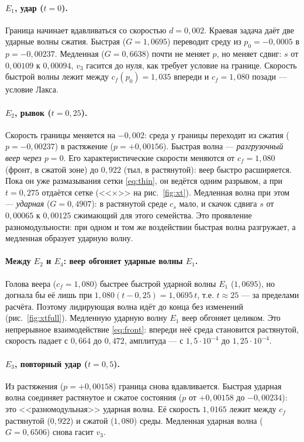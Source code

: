 \documentclass[11pt,a4paper]{article}
\theoremstyle{definition}
\theoremstyle{remark}
\begin{document}
\paragraph{$E_1$, удар ($t=0$).} Граница начинает вдавливаться со скоростью $d=0{,}002$. Краевая
задача даёт две ударные волны сжатия. Быстрая ($G=1{,}0695$) переводит среду из $p_0=-0{,}0005$
в $p=-0{,}00237$. Медленная ($G=0{,}6638$) почти не меняет $p$, но меняет сдвиг: $s$ от
$0{,}00109$ к $0{,}00094$, $v_3$ гасится до нуля, как требует условие на границе. Скорость
быстрой волны лежит между $c_f(p_0)=1{,}035$ впереди и $c_f=1{,}080$ позади --- условие Лакса.

\paragraph{$E_2$, рывок ($t=0{,}25$).} Скорость границы меняется на $-0{,}002$: среда у границы
переходит из сжатия ($p=-0{,}00237$) в растяжение ($p=+0{,}00156$). Быстрая волна ---
\emph{разгрузочный веер через $p=0$}. Его характеристические скорости меняются от $c_f=1{,}080$
(фронт, в сжатой зоне) до $0{,}922$ (тыл, в растянутой): веер быстро расширяется. Пока он уже
размазывания сетки \eqref{eq:thin}, он ведётся одним разрывом, а при $t=0{,}275$ отдаётся сетке
(<<$\times$>> на рис.~\ref{fig:xt}). Медленная волна при этом --- \emph{ударная}
($G=0{,}4907$): в растянутой среде $c_s$ мало, и скачок сдвига $s$ от $0{,}00065$ к $0{,}00125$
сжимающий для этого семейства. Это проявление разномодульности: при одном и том же воздействии
быстрая волна разгружает, а медленная образует ударную волну.

\paragraph{Между $E_2$ и $E_4$: веер обгоняет ударные волны $E_1$.} Голова веера ($c_f=1{,}080$)
быстрее быстрой ударной волны $E_1$ ($1{,}0695$), но догнала бы её лишь при
$1{,}080(t-0{,}25)=1{,}0695\,t$, т.е. $t\approx25$ --- за пределами расчёта. Поэтому лидирующая волна
идёт до конца без изменений (рис.~\ref{fig:xtfull}). Медленную ударную волну $E_1$ веер обгоняет
целиком. Это непрерывное взаимодействие \eqref{eq:front}: впереди неё среда становится растянутой,
скорость падает с $0{,}664$ до $0{,}472$, амплитуда --- с $1{,}5\cdot10^{-4}$ до $1{,}25\cdot10^{-4}$.

\paragraph{$E_3$, повторный удар ($t=0{,}5$).} Из растяжения ($p=+0{,}00158$) граница снова
вдавливается. Быстрая ударная волна соединяет растянутое и сжатое состояния ($p$ от $+0{,}00158$ до
$-0{,}00234$): это <<разномодульная>> ударная волна. Её скорость $1{,}0165$ лежит между $c_f$
растянутой ($0{,}922$) и сжатой ($1{,}080$) среды. Медленная ударная волна ($G=0{,}6506$) снова
гасит $v_3$.
\end{document}
